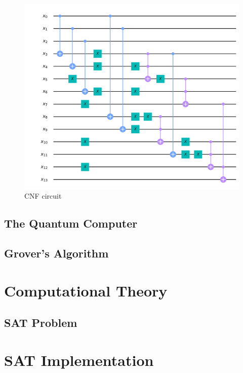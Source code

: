 \documentclass[english]{article}
\begin{document}
			\begin{figure}[ht]
				\centering
				\includegraphics[scale=0.35]{example6.png}
				\caption{CNF circuit}
			\end{figure}
	
				
		\subsection{The Quantum Computer}
		\label{sec:quantumComputer}
			
		\subsection{Grover's Algorithm}
		\label{sec:grover}
		
	\section{Computational Theory}
	\label{sec:computationalTheory}
		
		\subsection{SAT Problem}
		\label{sec:sat}
		
	\section{SAT Implementation}
	\label{sec:satImpl}
		
\end{document}
